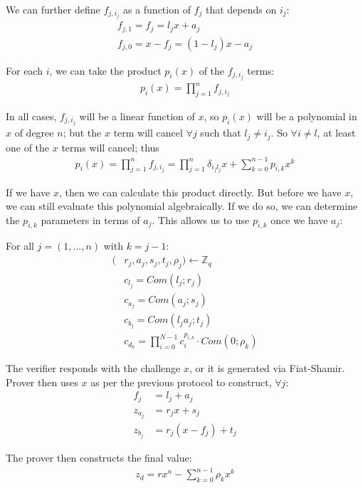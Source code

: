 \documentclass{article}
\begin{document}
We can further define $f_{j, i_j}$ as a function of $f_j$ that depends on $i_j$:
\begin{align}
  f_{j,1} = f_j = l_j x + a_j\\
  f_{j,0} = x - f_j = (1 - l_j) x - a_j
\end{align}

For each $i$, we can take the product $p_i(x)$ of the $f_{j, i_j}$ terms:
\begin{align}
  p_i(x) = \prod_{j=1}^{n} f_{j, i_j}
\end{align}

In all cases, $f_{j, i_j}$ will be a linear function of $x$, so $p_i(x)$ will be a polynomial in $x$ of degree $n$; but the $x$ term will cancel $\forall j$ such that $l_j \ne i_j$.  So $\forall i \ne l$, at least one of the $x$ terms will cancel; thus
\begin{align}
  p_i(x) = \prod_{j=1}^n f_{j,i_j} = {\prod_{j=1}^{n}\delta_{i_jl_j} x} + \sum_{k=0}^{n-1}{p_{i,k} x^k}
\end{align}

If we have $x$, then we can calculate this product directly.  But before we have $x$, we can still evaluate this polynomial algebraically.  If we do so, we can determine the $p_{i,k}$ parameters in terms of $a_j$.  This allows us to use $p_{i,k}$ once we have $a_j$:

For all $j = (1, ..., n)$ with $k = j - 1$:
\begin{align}
  (&r_j, a_j, s_j, t_j, \rho_j) \longleftarrow \mathbb{Z}_q\\
  &c_{l_j} = Com(l_j; r_j)\\
  &c_{a_j} = Com(a_j; s_j)\\
  &c_{b_j} = Com(l_j a_j; t_j)\\
  &c_{d_k} = \prod_{i=0}^{N-1}{c_i^{p_{i,k}}} \cdot Com(0; \rho_k)
\end{align}

The verifier responds with the challenge $x$, or it is generated via Fiat-Shamir.  Prover then uses $x$ as per the previous protocol to construct, $\forall j$:
\begin{align}
  f_j &= l_j + a_j\\
  z_{a_j} &= r_j x + s_j\\
  z_{b_j} &= r_j (x - f_j) + t_j
\end{align}

The prover then constructs the final value:
\begin{align}
  z_d = r x^n - \sum_{k=0}^{n-1}{\rho_k x^k}
\end{align}
\end{document}
